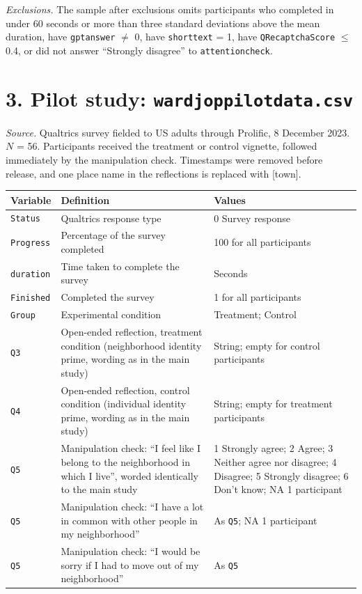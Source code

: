 \documentclass[11pt]{article}
\renewcommand{\_}{\oldunderscore\allowbreak}
\begin{document}
\emph{Exclusions.} The sample after exclusions omits participants who completed in under 60 seconds or more than three standard deviations above the mean duration, have \texttt{gpt\_answer} $\neq$ 0, have \texttt{short\_text} = 1, have \texttt{Q\_RecaptchaScore} $\leq$ 0.4, or did not answer ``Strongly disagree'' to \texttt{attention\_check}.

\section{3. Pilot study: \texttt{ward\_jop\_pilot\_data.csv}}

\emph{Source.} Qualtrics survey fielded to US adults through Prolific, 8 December 2023. $N$ = 56. Participants received the treatment or control vignette, followed immediately by the manipulation check. Timestamps were removed before release, and one place name in the reflections is replaced with [town].

\begin{longtable}{L{3.6cm}L{6.6cm}L{4.8cm}}
\toprule
\textbf{Variable} & \textbf{Definition} & \textbf{Values} \\
\midrule
\endhead
\bottomrule
\endfoot
\texttt{Status} & Qualtrics response type & 0 Survey response \\
\texttt{Progress} & Percentage of the survey completed & 100 for all participants \\
\texttt{duration} & Time taken to complete the survey & Seconds \\
\texttt{Finished} & Completed the survey & 1 for all participants \\
\texttt{Group} & Experimental condition & Treatment; Control \\
\texttt{Q3} & Open-ended reflection, treatment condition (neighborhood identity prime, wording as in the main study) & String; empty for control participants \\
\texttt{Q4} & Open-ended reflection, control condition (individual identity prime, wording as in the main study) & String; empty for treatment participants \\
\texttt{Q5\_1} & Manipulation check: ``I feel like I belong to the neighborhood in which I live'', worded identically to the main study & 1 Strongly agree; 2 Agree; 3 Neither agree nor disagree; 4 Disagree; 5 Strongly disagree; 6 Don't know; NA 1 participant \\
\texttt{Q5\_2} & Manipulation check: ``I have a lot in common with other people in my neighborhood'' & As \texttt{Q5\_1}; NA 1 participant \\
\texttt{Q5\_3} & Manipulation check: ``I would be sorry if I had to move out of my neighborhood'' & As \texttt{Q5\_1} \\
\end{longtable}
\end{document}
